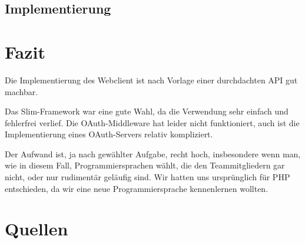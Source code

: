 \section{Implementierung}

\chapter{Fazit}

Die Implementierung des Webclient ist nach Vorlage einer durchdachten API gut machbar.

Das Slim-Framework war eine gute Wahl, da die Verwendung sehr einfach und fehlerfrei verlief.
Die OAuth-Middleware hat leider nicht funktioniert, auch ist die Implementierung eines OAuth-Servers relativ kompliziert.

Der Aufwand ist, ja nach gewählter Aufgabe, recht hoch, insbesondere wenn man, wie in diesem Fall, Programmiersprachen wählt, die den Teammitgliedern gar nicht, oder nur rudimentär geläufig sind.
Wir hatten uns ursprünglich für PHP entschieden, da wir eine neue Programmiersprache kennenlernen wollten.

\chapter{Quellen}

